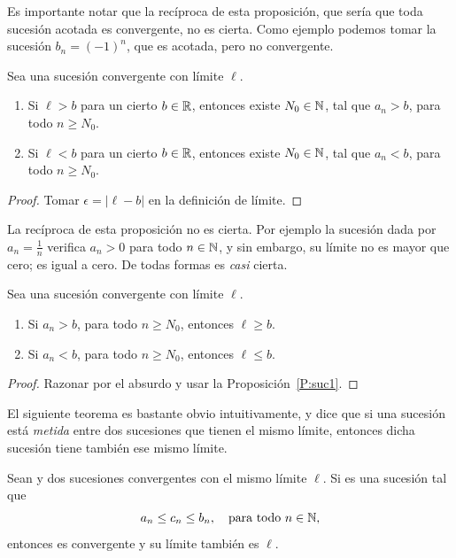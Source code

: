 Es importante notar que la recíproca de esta proposición, que sería que toda sucesión acotada es convergente, no es cierta. Como ejemplo podemos tomar la sucesión $b_n = (-1)^n$, que es acotada, pero no convergente.

\begin{proposition}\label{P:suc1}
    Sea \sucan una sucesión convergente con límite $\ell$.
    \begin{enumerate}[{\rm (a)}]
        \item Si $\ell > b$ para un cierto $b\in \mathbb{R}$, entonces existe $N_0\in\mathbb{N}$, tal que $a_n>b$, para todo $n\ge N_0$.
        \item Si $\ell < b$ para un cierto $b\in \mathbb{R}$, entonces existe $N_0\in\mathbb{N}$, tal que $a_n<b$, para todo $n\ge N_0$.
    \end{enumerate}
\end{proposition}

\begin{proof}
    Tomar $\epsilon = |\ell-b|$ en la definición de límite.
\end{proof}

La recíproca de esta proposición no es cierta. Por ejemplo la sucesión dada por $a_n=\frac1n$ verifica $a_n>0$ para todo $n\in \mathbb{N}$, y sin embargo, su límite no es mayor que cero; es igual a cero. De todas formas es \emph{casi} cierta.

\begin{corollary}
    Sea \sucan una sucesión convergente con límite $\ell$.
    \begin{enumerate}[{\rm (a)}]
        \item Si $a_n>b$, para todo $n\ge N_0$, entonces $\ell\ge b$.
        \item Si $a_n<b$, para todo $n\ge N_0$, entonces $\ell\le b$.
    \end{enumerate}
\end{corollary}

\begin{proof}
    Razonar por el absurdo y usar la Proposición~\ref{P:suc1}.
\end{proof}

El siguiente teorema es bastante obvio intuitivamente, y dice que si una sucesión está \emph{metida} entre dos sucesiones que tienen el mismo límite, entonces dicha sucesión tiene también ese mismo límite.

\begin{theorem}\label{T:suc. emparedado}
Sean \sucan y \sucbn dos sucesiones convergentes con el mismo límite $\ell$.
Si \succn es una sucesión tal que 
\[
a_n\le c_n\le b_n, \quad\text{para todo $n\in\mathbb{N}$},
\]    
entonces \succn es convergente y su límite también es $\ell$.
\end{theorem}

